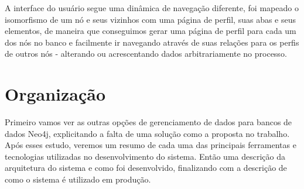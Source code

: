 A interface do usuário segue uma dinâmica de navegação diferente, foi mapeado o isomorfismo de um nó e seus vizinhos com uma página de perfil, suas abas e seus elementos, de maneira que conseguimos gerar uma página de perfil para cada um dos nós no banco e facilmente ir navegando através de suas relações para os perfis de outros nós - alterando ou acrescentando dados arbitrariamente no processo.

\section{Organização}

Primeiro vamos ver as outras opções de gerenciamento de dados para bancos de dados Neo4j, explicitando a falta de uma solução como a proposta no trabalho. Após esses estudo, veremos um resumo de cada uma das principais ferramentas e tecnologias utilizadas no desenvolvimento do sistema. Então uma descrição da arquitetura do sistema e como foi desenvolvido, finalizando com a descrição de como o sistema é utilizado em produção.